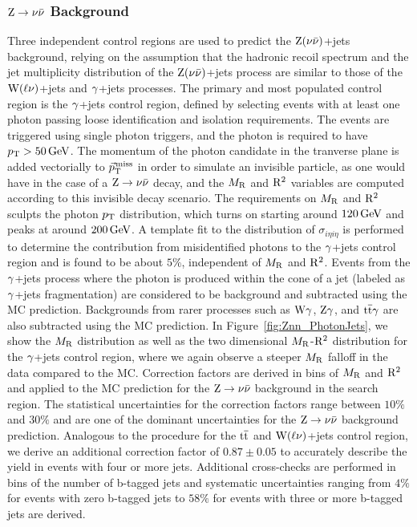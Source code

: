 \subsubsection{$\mathrm{Z}\to\nu\bar\nu$ Background}
\label{sec:ZInvCR}
Three independent control regions are used to predict the $\mathrm{Z}(\nu\bar\nu)$+jets background,
relying on the assumption that the hadronic recoil spectrum and the jet multiplicity distribution
of the $\mathrm{Z}(\nu\bar\nu)$+jets process are similar to those of the $\mathrm{W}(\ell\nu)$+jets and $\gamma$+jets 
processes. The primary and most populated control region is the $\gamma$+jets control region, 
defined by selecting events with at least one photon passing loose identification and
isolation requirements. The events are triggered using single photon triggers, and 
the photon is required to have $p_{\mathrm{T}}>50\,\text{Ge\hspace{-.08em}V}$. The momentum of the photon candidate
in the tranverse plane is added vectorially to ${\vec p}_{\mathrm{T}}^{\kern1pt\text{miss}}$ 
in order to simulate an invisible particle, as one would have in the case of a 
$\mathrm{Z}\to\nu\bar\nu$ decay, and the $M_\mathrm{R}$ and $\mathrm{R}^2$ variables are computed according to
this invisible decay scenario. The requirements on $M_\mathrm{R}$ and $\mathrm{R}^2$ sculpts the
photon $p_{\mathrm{T}}$ distribution, which turns on starting around $120\,\text{Ge\hspace{-.08em}V}$ and peaks at around
$200\,\text{Ge\hspace{-.08em}V}$.  A template fit to the distribution of $\sigma_{i \eta i \eta}$ is 
performed to determine the contribution from misidentified photons to the $\gamma$+jets 
control region and is found to be about $5\%$, independent of $M_\mathrm{R}$ and $\mathrm{R}^2$. 
Events from the $\gamma$+jets process where the photon is produced within the cone of a jet
(labeled as $\gamma$+jets fragmentation) are considered to be background and subtracted
using the MC prediction. Backgrounds from rarer processes such as $\mathrm{W}\gamma$, $\mathrm{Z}\gamma$, 
and $\mathrm{t}\overline{\mathrm{t}}\gamma$ are also subtracted using the MC prediction.
In Figure~\ref{fig:Znn_PhotonJets}, we show the $M_\mathrm{R}$ distribution as well as the two
dimensional $M_\mathrm{R}$-$\mathrm{R}^2$ distribution for the $\gamma$+jets control region, where we again 
observe a steeper $M_\mathrm{R}$ falloff in the data compared to the MC. Correction factors 
are derived in bins of $M_\mathrm{R}$ and $\mathrm{R}^2$ and applied to the MC prediction for the 
$\mathrm{Z}\to\nu\bar\nu$ background in the search region. The statistical uncertainties for the 
correction factors range between $10\%$ and $30\%$ and are one of the dominant uncertainties
for the $\mathrm{Z}\to\nu\bar\nu$ background prediction. 
Analogous to the procedure for the $\mathrm{t}\overline{\mathrm{t}}$ and $\mathrm{W}(\ell\nu)$+jets control region, we derive an additional correction
factor of $0.87 \pm 0.05$ to accurately describe the yield in events with four or more jets. Additional
cross-checks are performed in bins of the number of b-tagged jets and systematic uncertainties ranging
from $4\%$ for events with zero b-tagged jets to $58\%$ for events with three or more b-tagged jets are
derived.

